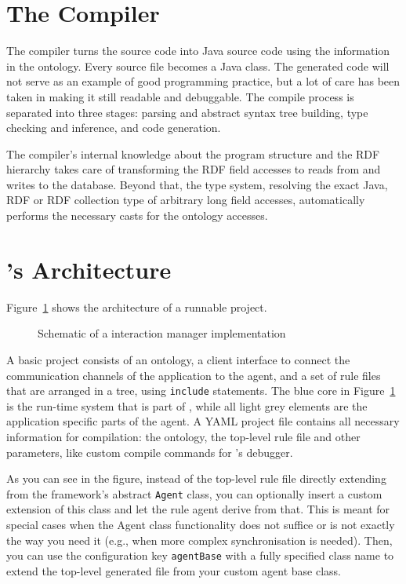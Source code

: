 \newcommand{\caret}{{\large\textbf{\textasciicircum}}}

\section{The \vonda Compiler}

The compiler turns the \vonda source code into Java source code using the
information in the ontology. Every source file becomes a Java class. The
generated code will not serve as an example of good programming practice, but a
lot of care has been taken in making it still readable and debuggable. The
compile process is separated into three stages: parsing and abstract syntax
tree building, type checking and inference, and code generation.

The \vonda compiler's internal knowledge about the program structure and the
RDF hierarchy takes care of transforming the RDF field accesses to reads from
and writes to the database. Beyond that, the type system, resolving the exact
Java, RDF or RDF collection type of arbitrary long field accesses,
automatically performs the necessary casts for the ontology accesses.

\section{\vonda's Architecture}

Figure~\ref{fig:architecture} shows the architecture of a runnable \vonda project.

\begin{figure}[htbp]
  \centering
  
  \caption{Schematic of a \vonda interaction manager implementation}
  \label{fig:architecture}
\end{figure}

A basic \vonda project consists of an ontology, a client interface to
connect the communication channels of the application to the agent,
and a set of rule files that are arranged in a tree, using
\texttt{include} statements. The blue core in
Figure~\ref{fig:architecture} is the run-time system that is part of
\vonda, while all light grey elements are the application specific
parts of the agent. A YAML project file contains all
necessary information for compilation: the ontology, the top-level
rule file and other parameters, like custom compile commands for
\vonda's debugger.

As you can see in the figure, instead of the top-level rule file
directly extending from the framework's abstract \texttt{Agent} class,
you can optionally insert a custom extension of this class and let the
rule agent derive from that. This is meant for special cases when the
Agent class functionality does not suffice or is not exactly the way
you need it (e.g., when more complex synchronisation is needed). Then,
you can use the configuration key \texttt{agentBase} with a fully
specified class name to extend the top-level generated file from your
custom agent base class.

